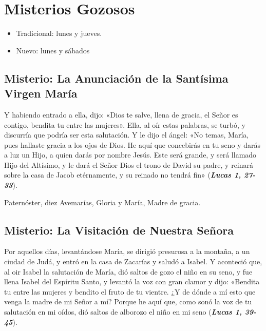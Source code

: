 \documentclass[./main.tex]{subfiles}
\newcounter{joyful-counter}
\begin{document}
\section*{Misterios Gozosos}

\begin{itemize}
      \item Tradicional: lunes y jueves.
      \item Nuevo: lunes y sábados
\end{itemize}

\subsection*{ Misterio: La Anunciación de la Santísima Virgen María}
Y habiendo entrado a ella, dijo: «Dios te salve, llena de gracia, el Señor es contigo, bendita tu entre las mujeres».
Ella, al oír estas palabras, se turbó, y discurría que podría ser esta salutación. Y le dijo el ángel: «No temas, María,
pues hallaste gracia a los ojos de Dios. He aquí que concebirás en tu seno y darás a luz un Hijo, a quien darás por
nombre Jesús. Este será grande, y será llamado Hijo del Altísimo, y le dará el Señor Dios el trono de David su padre,
y reinará sobre la casa de Jacob etérnamente, y su reinado no tendrá fin» (\textbf{\emph{Lucas 1, 27-33}}).

\begin{center}
      Paternóster, diez Avemarías, Gloria y María, Madre de gracia.
\end{center}

\subsection*{ Misterio: La Visitación de Nuestra Señora}
Por aquellos días, levantándose María, se dirigió presurosa a la montaña, a un ciudad de Judá, y entró en la casa de Zacarías y saludó a Isabel.
Y aconteció que, al oir Isabel la salutación de María, dió saltos de gozo el niño en su seno, y fue llena Isabel del Espíritu Santo,
y levantó la voz con gran clamor y dijo: «Bendita tu entre las mujeres y bendito el fruto de tu vientre. ¿Y de dónde a mí esto que venga la madre de mi Señor a mí?
Porque he aquí que, como sonó la voz de tu salutación en mi oídos, dió saltos de alborozo el niño en mi seno (\textbf{\emph{Lucas 1, 39-45}}).
\end{document}
